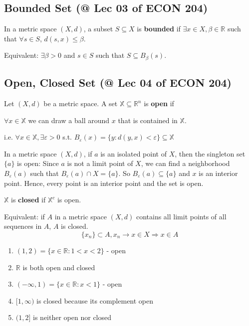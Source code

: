 \documentclass[11pt]{elegantbook}
\begin{document}
\subsection{Bounded Set \small{(@ Lec 03 of ECON 204)}}
\begin{definition}
    \normalfont
    In a metric space $(X, d)$, a subset $S \subseteq X$ is \textbf{bounded} if $\exists x \in X, \beta \in \mathbb{R}$ such that $\forall s \in S$, $d(s, x) \leq \beta$.
\end{definition}
Equivalent: $\exists \beta>0$ and $s\in S$ such that $S\subseteq B_\beta(s)$.



\subsection{Open, Closed Set \small{(@ Lec 04 of ECON 204)}}
\begin{definition}
    Let $(X, d)$ be a metric space. A set $\mathbb{X} \subseteq \mathbb{R}^{n}$ is \textbf{open} if
    
    $\forall x \in \mathbb{X}$ we can draw a ball around $x$ that is contained in $\mathbb{X}$.

    i.e. $\forall x \in \mathbb{X}, \exists \varepsilon>0$ s.t. $B_\varepsilon(x)=\{y:d(y,x)<\varepsilon\} \subseteq \mathbb{X}$
\end{definition}

\begin{example}
    In a metric space $(X, d)$, if $a$ is an isolated point of $X$, then the singleton set $\{a\}$ is open: Since $a$ is not a limit point of $X$, we can find a neighborhood $B_\varepsilon(a)$ such that $B_\varepsilon(a)\cap X = \{a\}$. So $B_\varepsilon(a) \subseteq \{a\}$ and $x$ is an interior point. Hence, every point is an interior point and the set is open.
\end{example}

\begin{definition}
    $\mathbb{X}$ is \textbf{closed} if $\mathbb{X}^c$ is open.
\end{definition}
\begin{theorem}
    Equivalent: if $A$ in a metric space $(X, d)$ contains all limit points of all sequences in $A$, $A$ is closed.
    $$\{x_n\}\subset A, x_n \rightarrow x\in X \Rightarrow x\in A$$
\end{theorem}
\begin{example}
\end{example}
\begin{enumerate}[1)]
    \item $(1,2)=\{x \in \mathbb{R}: 1<x<2\}$ - open
    \item $\mathbb{R}$ is both open and closed
    \item $(-\infty, 1)=\{x \in \mathbb{R}: x<1\}$ - open
    \item $[1, \infty)$ is closed because its complement open
    \item $(1,2]$ is neither open nor closed
\end{enumerate}
\end{document}
